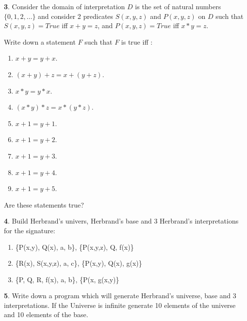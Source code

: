 \documentclass{article}
\begin{document}
\bigskip

{\bf 3}.  Consider the domain of interpretation $D$ is the set of natural numbers $\{0, 1, 2, \dots\}$ and consider 2 predicates $S(x,y,z)$ and $P(x,y,z)$ on $D$ such that $S(x,y,z) = True$ iff $x+y = z$, and $P(x,y,z) = True$ iff $x*y = z$.  

Write down a statement $F$ such that $F$ is true iff :
\begin{enumerate}
\item $x+y = y +x$.
\item $(x+y)+z = x+(y+z)$.
\item $x*y = y *x$.
\item $(x*y)*z = x*(y*z)$.
\item $x+1 = y +1$.
\item $x+1 = y +2$.
\item $x+1 = y +3$.
\item $x+1 = y +4$.
\item $x+1 = y +5$.
\end{enumerate}
Are these statements true?

\bigskip

{\bf 4}. Build Herbrand's univers, Herbrand's base and 3 Herbrand's interpretations for the signature:
\begin{enumerate}
\item \{P(x,y), Q(x), a, b\}, \{P(x,y,z), Q, f(x)\}
\item \{R(x), S(x,y,z), a, c\}, \{P(x,y), Q(x), g(x)\}
\item \{P, Q, R, f(x), a, b\}, \{P(x, g(x,y)\}
\end{enumerate}


\bigskip

{\bf 5}. Write down a program which will generate Herbrand's universe, base and 3 interpretations. If the Universe is infinite generate 10 elements of the universe and 10 elements of the base.  
\end{document}
